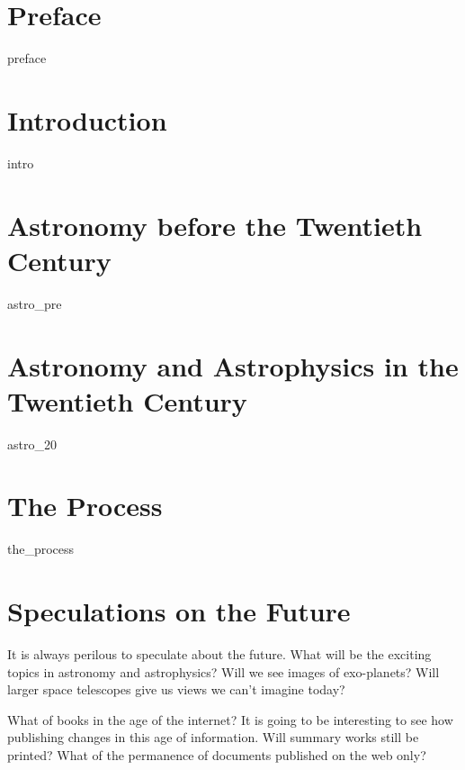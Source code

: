 \documentclass{book}%
\begin{document}
\title{\BookTitle}
\author{James R. Fowler}
\date{copy of \today}
\maketitle

\vspace*{5 in}

\tableofcontents

\chapter{Preface}
{preface}

\chapter{Introduction}
{intro}

\chapter{Astronomy before the Twentieth Century}
{astro_pre}

\chapter{Astronomy and Astrophysics in the Twentieth Century}
{astro_20}

\chapter{The Process}
{the_process}

\chapter{Speculations on the Future}

It is always perilous to speculate about the future.  What will be the
exciting topics in astronomy and astrophysics?  Will we see images of
exo-planets?  Will larger space telescopes give us views we can't
imagine today?

What of books in the age of the internet?  It is going to be
interesting to see how publishing changes in this age of information.
Will summary works still be printed? What of the permanence of
documents published on the web only?

\appendix
\end{document}
